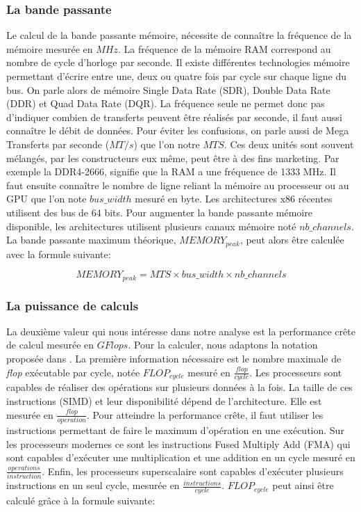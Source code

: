 \subsubsection{La bande passante}
Le calcul de la bande passante mémoire, nécessite de connaître la fréquence de la mémoire mesurée en $MHz$. La fréquence de la mémoire RAM correspond au nombre de cycle d'horloge par seconde. Il existe différentes technologies mémoire permettant d'écrire entre une, deux ou quatre fois par cycle sur chaque ligne du bus. On parle alors de mémoire Single Data Rate (SDR), Double Data Rate (DDR) et Quad Data Rate (DQR). La fréquence seule ne permet donc pas d'indiquer combien de transferts peuvent être réalisés par seconde, il faut aussi connaître le débit de données. Pour éviter les confusions, on parle aussi de Mega Transferts par seconde ($MT/s$) que l'on notre $MTS$. Ces deux unités sont souvent mélangés, par les constructeurs eux même, peut être à des fins marketing. Par exemple la DDR4-2666, signifie que la RAM a une fréquence de 1333 MHz. Il faut ensuite connaître le nombre de ligne reliant la mémoire au processeur ou au GPU que l'on note $bus\_width$ mesuré en byte. Les architectures x86 récentes utilisent des bus de 64 bits. Pour augmenter la bande passante mémoire disponible, les architectures utilisent plusieurs canaux mémoire noté $nb\_channels$.
La bande passante maximum théorique, $MEMORY_{peak}$, peut alors être calculée avec la formule suivante:

\begin{equation}
\label{eq:bw}
    MEMORY_{peak} = MTS \times bus\_width \times nb\_channels
\end{equation}


\subsubsection{La puissance de calculs}
La deuxième valeur qui nous intéresse dans notre analyse est la performance crête de calcul mesurée en $GFlops$. Pour la calculer, nous adaptons la notation proposée dans \cite{dolbeau2015theoretical}.
La première information nécessaire est le nombre maximale de \textit{flop} exécutable par cycle, notée $FLOP_{cycle}$ mesuré en $\frac{flop}{cycle}$. 
Les processeurs sont capables de réaliser des opérations sur plusieurs données à la fois. La taille de ces instructions (SIMD) et leur disponibilité dépend de l'architecture. Elle est mesurée en $\frac{flop}{operation}$.
Pour atteindre la performance crête, il faut utiliser les instructions permettant de faire le maximum d'opération en une exécution. Sur les processeurs modernes ce sont les instructions Fused Multiply Add (FMA) qui sont capables d'exécuter une multiplication et une addition en un cycle mesuré en $\frac{operations}{instruction}$. Enfin, les processeurs superscalaire sont capables d'exécuter plusieurs instructions en un seul cycle, mesurée en $\frac{instructions}{cycle}$. $FLOP_{cycle}$ peut ainsi être calculé grâce à la formule suivante:

